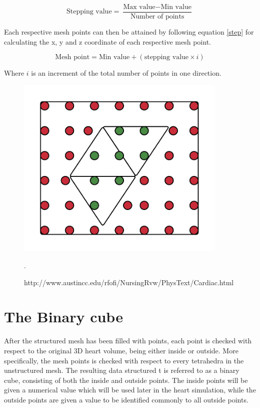\begin{equation} \label{step}
\textrm{Stepping value} = \frac{\textrm{Max value} - \textrm{Min value}}{\textrm{Number of points}} 
\end{equation}

Each respective mesh points can then be attained by following equation \ref{step} for calculating the x, y and z coordinate of each respective mesh point.

\begin{equation} \label{step}
\textrm{Mesh point} = \textrm{Min value} + (\textrm{stepping value} \times i)
\end{equation}

Where \(i\) is an increment of the total number of points in one direction. 


\begin{figure}[h]
 \centering 
     \includegraphics[width=0.9\textwidth]{bilder/m_points_inside}
     \caption{http://www.austincc.edu/rfofi/NursingRvw/PhysText/Cardiac.html}.
     \label{m_points_inside.png}
\end{figure}


\section{The Binary cube}
After the structured mesh has been filled with points, each point is checked with respect to the original 3D heart volume, being either inside or outside. More specifically, the mesh points is checked with respect to every tetrahedra in the unstructured mesh. The resulting data structured t is referred to as a binary cube, consisting of both the inside and outside points. The inside points will be given a numerical value which will be used later in the heart simulation, while the outside points are given a value to be identified commonly to all outside points.

